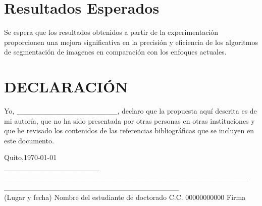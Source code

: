 \documentclass[a4paper,12pt]{article}
\begin{document}
	\newpage
	
	\section{Resultados Esperados}
	Se espera que los resultados obtenidos a partir de la experimentación proporcionen una mejora significativa en la precisión y eficiencia de los algoritmos de segmentación de imagenes en comparación con los enfoques actuales.\cite{referencia2}
	
	\newpage
	
\section*{}

%			
%			

\newpage
	
	\section*{DECLARACIÓN}
	
	Yo, \_\_\_\_\_\_\_\_\_\_\_\_\_\_\_\_\_\_\_, declaro que la propuesta aquí descrita es de mi autoría, que no ha sido presentada por otras personas en otras instituciones y que he revisado los contenidos de las referencias bibliográficas que se incluyen en este documento.
	
	\vspace{1cm}
	
	\begin{flushleft}
			Quito,\today\\
		\_\_\_\_\_\_\_\_\_\_\_\_\_\_\_\_\_\_\hspace{0.1cm} \_\_\_\_\_\_\_\_\_\_\_\_\_\_\_\_\_\_\_\_\_\_\_\_\_\_\_\_\_\_\_\_\_\_\_\_\_\_\_\_\_\_\_\_\_\_  \hspace{0.3cm}\_\_\_\_\_\_\_\_\_\_\_\_\_\_\_\_\_\hspace{0.1cm}\_\_\_\_\_\_\_\_\_\_\_\_\_\_\_\_\\
		(Lugar y fecha) \hspace{0.2cm} Nombre del estudiante de doctorado \hspace{0.2cm} C.C.\hspace{0.05cm} 00000000000 \hspace{0.1cm} Firma \\
	\end{flushleft}
	
\end{document}
